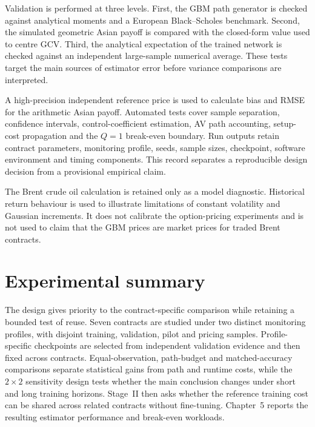 Validation is performed at three levels. First, the GBM path generator is checked against analytical moments and a European Black--Scholes benchmark. Second, the simulated geometric Asian payoff is compared with the closed-form value used to centre GCV. Third, the analytical expectation of the trained network is checked against an independent large-sample numerical average. These tests target the main sources of estimator error before variance comparisons are interpreted.

A high-precision independent reference price is used to calculate bias and RMSE for the arithmetic Asian payoff. Automated tests cover sample separation, confidence intervals, control-coefficient estimation, AV path accounting, setup-cost propagation and the $Q = 1$ break-even boundary. Run outputs retain contract parameters, monitoring profile, seeds, sample sizes, checkpoint, software environment and timing components. This record separates a reproducible design decision from a provisional empirical claim.

The Brent crude oil calculation is retained only as a model diagnostic. Historical return behaviour is used to illustrate limitations of constant volatility and Gaussian increments. It does not calibrate the option-pricing experiments and is not used to claim that the GBM prices are market prices for traded Brent contracts.

\section{Experimental summary}

The design gives priority to the contract-specific comparison while retaining a bounded test of reuse. Seven contracts are studied under two distinct monitoring profiles, with disjoint training, validation, pilot and pricing samples. Profile-specific checkpoints are selected from independent validation evidence and then fixed across contracts. Equal-observation, path-budget and matched-accuracy comparisons separate statistical gains from path and runtime costs, while the $2 \times 2$ sensitivity design tests whether the main conclusion changes under short and long training horizons. Stage~II then asks whether the reference training cost can be shared across related contracts without fine-tuning. Chapter~5 reports the resulting estimator performance and break-even workloads.
